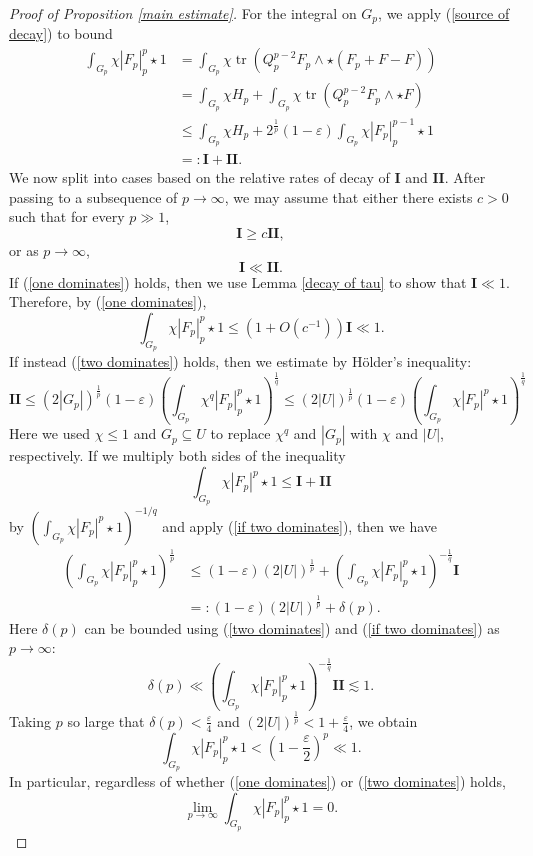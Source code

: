 \documentclass[reqno,11pt]{amsart}
\DeclareMathOperator{\tr}{tr}
\theoremstyle{definition}
\numberwithin{equation}{section}
\begin{document}
\begin{proof}[Proof of Proposition \ref{main estimate}]
For the integral on $G_p$, we apply (\ref{source of decay}) to bound
\begin{align*}
\int_{G_p} \chi |F_p|_p^p \star 1
&= \int_{G_p} \chi \tr(Q_p^{p - 2} F_p \wedge \star (F_p + F - F)) \\
&= \int_{G_p} \chi H_p + \int_{G_p} \chi \tr(Q_p^{p - 2} F_p \wedge \star F) \\
&\leq \int_{G_p} \chi H_p + 2^{\frac{1}{p}} (1 - \varepsilon) \int_{G_p} \chi |F_p|_p^{p - 1} \star 1 \\
&=: \mathbf I + \mathbf{II}.
\end{align*}
We now split into cases based on the relative rates of decay of $\mathbf I$ and $\mathbf{II}$.
After passing to a subsequence of $p \to \infty$, we may assume that either there exists $c > 0$ such that for every $p \gg 1$,
\begin{equation}\label{one dominates}
\mathbf I \geq c \mathbf{II},
\end{equation}
or as $p \to \infty$,
\begin{equation}\label{two dominates}
\mathbf I \ll \mathbf{II}.
\end{equation}
If (\ref{one dominates}) holds, then we use Lemma \ref{decay of tau} to show that $\mathbf I \ll 1$.
Therefore, by (\ref{one dominates}),
$$\int_{G_p} \chi |F_p|_p^p \star 1 \leq (1 + O(c^{-1})) \mathbf I \ll 1.$$
If instead (\ref{two dominates}) holds, then we estimate by H\"older's inequality:
\begin{equation}\label{if two dominates}
\mathbf{II}
\leq (2|G_p|)^{\frac{1}{p}} (1 - \varepsilon) \left(\int_{G_p} \chi^q |F_p|_p^p \star 1\right)^{\frac{1}{q}}
\leq (2|U|)^{\frac{1}{p}} (1 - \varepsilon) \left(\int_{G_p} \chi |F_p|^p \star 1\right)^{\frac{1}{q}}
\end{equation}
Here we used $\chi \leq 1$ and $G_p \subseteq U$ to replace $\chi^q$ and $|G_p|$ with $\chi$ and $|U|$, respectively.
If we multiply both sides of the inequality
$$\int_{G_p} \chi |F_p|^p \star 1 \leq \mathbf I + \mathbf{II}$$
by $(\int_{G_p} \chi |F_p|^p \star 1)^{-1/q}$ and apply (\ref{if two dominates}), then we have
\begin{align*}
\left(\int_{G_p} \chi |F_p|_p^p \star 1\right)^{\frac{1}{p}} 
&\leq (1 - \varepsilon) (2|U|)^{\frac{1}{p}} + \left(\int_{G_p} \chi |F_p|_p^p \star 1\right)^{-\frac{1}{q}} \mathbf I \\
&=: (1 - \varepsilon) (2|U|)^{\frac{1}{p}} + \delta(p).
\end{align*}
Here $\delta(p)$ can be bounded using (\ref{two dominates}) and (\ref{if two dominates}) as $p \to \infty$:
$$\delta(p) \ll \left(\int_{G_p} \chi |F_p|_p^p \star 1\right)^{-\frac{1}{q}} \mathbf{II} \lesssim 1.$$
Taking $p$ so large that $\delta(p) < \frac{\varepsilon}{4}$ and $(2|U|)^{\frac{1}{p}} < 1 + \frac{\varepsilon}{4}$, we obtain
$$\int_{G_p} \chi |F_p|_p^p \star 1 < \left(1 - \frac{\varepsilon}{2}\right)^p \ll 1.$$
In particular, regardless of whether (\ref{one dominates}) or (\ref{two dominates}) holds,
\begin{equation}\label{decay on positive}
\lim_{p \to \infty} \int_{G_p} \chi |F_p|_p^p \star 1 = 0.
\end{equation}


\end{proof}
\end{document}
